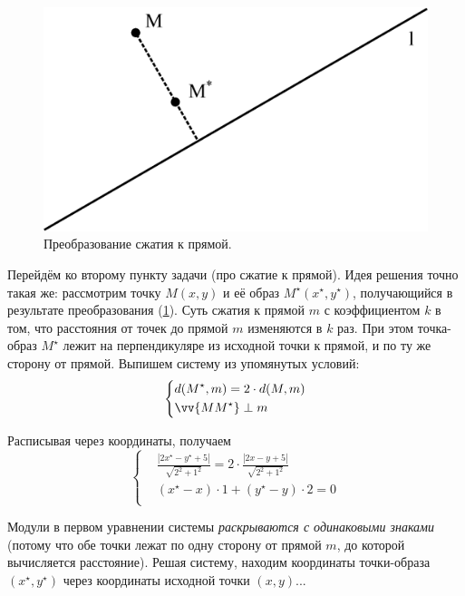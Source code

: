 \documentclass[a4paper,12pt]{article}
\begin{document}
\begin{solution}
    \bigskip
    
    \begin{figure}
      \centering
      
      \includegraphics[width=0.5\columnwidth]{compressione-linea}
      
      \caption{Преобразование сжатия к прямой.}
      \label{fig:compressione-linea}
    \end{figure}
    
    Перейдём ко второму пункту задачи (про сжатие к прямой).
    Идея решения точно такая же: рассмотрим точку $M(x, y)$ и её образ $M^\star(x^\star, y^\star)$, получающийся в результате преобразования (\ref{fig:compressione-linea}).
    Суть сжатия к прямой $m$ с коэффициентом $k$ в том, что расстояния от точек до прямой $m$ изменяются в $k$ раз.
    При этом точка-образ $M^\star$ лежит на перпендикуляре из исходной точки к прямой, и по ту же сторону от прямой.
    Выпишем систему из упомянутых условий:
    \[
      \left\{
        \begin{aligned}
          &d(M^\star, m) = 2 \cdot d(M, m)\\
          &\vv{M M^\star} \perp m\\
        \end{aligned}
      \right.
    \]
    
    Расписывая через координаты, получаем
    \[
      \left\{
        \begin{aligned}
          &\frac{|2x^\star - y^\star + 5|}{\sqrt{2^2 + 1^2}} = 2 \cdot \frac{|2x - y + 5|}{\sqrt{2^2 + 1^2}}\\
          &(x^\star - x) \cdot 1 + (y^\star - y) \cdot 2 = 0\\
        \end{aligned}
      \right.
    \]
    
    Модули в первом уравнении системы \emph{раскрываются с одинаковыми знаками} (потому что обе точки лежат по одну сторону от прямой $m$, до которой вычисляется расстояние).
    Решая систему, находим координаты точки-образа $(x^\star, y^\star)$ через координаты исходной точки $(x, y)$...
  \end{solution}
  
\end{document}
